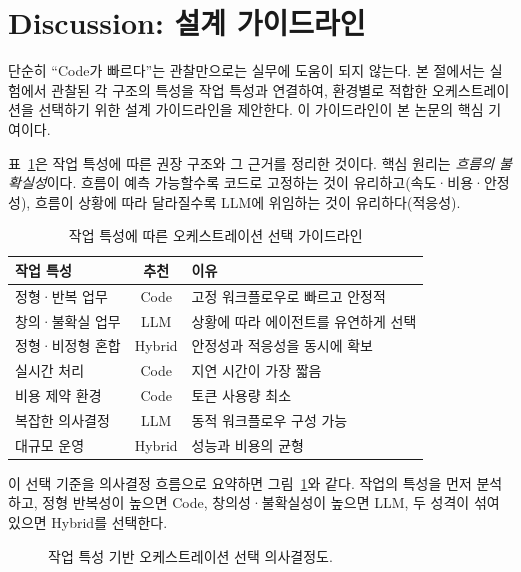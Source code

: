 \section{Discussion: 설계 가이드라인}

단순히 ``Code가 빠르다''는 관찰만으로는 실무에 도움이 되지 않는다. 본
절에서는 실험에서 관찰된 각 구조의 특성을 작업 특성과 연결하여, 환경별로
적합한 오케스트레이션을 선택하기 위한 설계 가이드라인을 제안한다. 이
가이드라인이 본 논문의 핵심 기여이다.

표~\ref{tab:guideline}은 작업 특성에 따른 권장 구조와 그 근거를
정리한 것이다. 핵심 원리는 \emph{흐름의 불확실성}이다. 흐름이 예측
가능할수록 코드로 고정하는 것이 유리하고(속도·비용·안정성), 흐름이
상황에 따라 달라질수록 LLM에 위임하는 것이 유리하다(적응성).

\begin{table}[t]
\centering
\caption{작업 특성에 따른 오케스트레이션 선택 가이드라인}
\label{tab:guideline}
\renewcommand{\arraystretch}{1.25}
\begin{tabular}{p{2.4cm}cp{3.0cm}}
\toprule
\textbf{작업 특성} & \textbf{추천} & \textbf{이유} \\
\midrule
정형·반복 업무   & Code   & 고정 워크플로우로 빠르고 안정적 \\
창의·불확실 업무 & LLM    & 상황에 따라 에이전트를 유연하게 선택 \\
정형·비정형 혼합 & Hybrid & 안정성과 적응성을 동시에 확보 \\
실시간 처리      & Code   & 지연 시간이 가장 짧음 \\
비용 제약 환경   & Code   & 토큰 사용량 최소 \\
복잡한 의사결정  & LLM    & 동적 워크플로우 구성 가능 \\
대규모 운영      & Hybrid & 성능과 비용의 균형 \\
\bottomrule
\end{tabular}
\end{table}

이 선택 기준을 의사결정 흐름으로 요약하면 그림~\ref{fig:tree}와 같다.
작업의 특성을 먼저 분석하고, 정형 반복성이 높으면 Code, 창의성·불확실성이
높으면 LLM, 두 성격이 섞여 있으면 Hybrid를 선택한다.

\begin{figure}[t]
\centering
{}
\caption{작업 특성 기반 오케스트레이션 선택 의사결정도.}
\label{fig:tree}
\end{figure}

